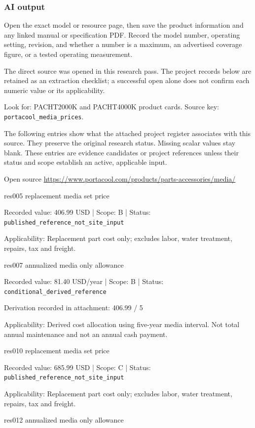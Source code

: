 \subsubsection*{AI output}
Open the exact model or resource page, then save the product information and any linked manual or specification PDF. Record the model number, operating setting, revision, and whether a number is a maximum, an advertised coverage figure, or a tested operating measurement.

The direct source was opened in this research pass. The project records below are retained as an extraction checklist; a successful open alone does not confirm each numeric value or its applicability.

Look for: PACHT2000K and PACHT4000K product cards. Source key: \nolinkurl{portacool_media_prices}.

The following entries show what the attached project register associates with this source. They preserve the original research status. Missing scalar values stay blank. These entries are evidence candidates or project references unless their status and scope establish an active, applicable input.

Open source  \url{https://www.portacool.com/products/parts-accessories/media/}

res005  replacement media set price

Recorded value: 406.99 USD | Scope: B | Status: \nolinkurl{published_reference_not_site_input}

Applicability: Replacement part cost only; excludes labor, water treatment, repairs, tax and freight.

res007  annualized media only allowance

Recorded value: 81.40 USD/year | Scope: B | Status: \nolinkurl{conditional_derived_reference}

Derivation recorded in attachment: 406.99 / 5

Applicability: Derived cost allocation using five-year media interval. Not total annual maintenance and not an annual cash payment.

res010  replacement media set price

Recorded value: 685.99 USD | Scope: C | Status: \nolinkurl{published_reference_not_site_input}

Applicability: Replacement part cost only; excludes labor, water treatment, repairs, tax and freight.

res012  annualized media only allowance

